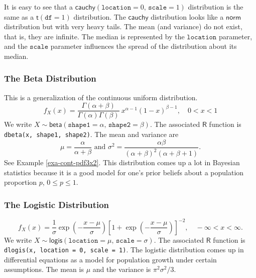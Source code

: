 \documentclass[captions=tableheading]{scrbook}
\begin{document}
It is easy to see that a \(\mathsf{cauchy}(\mathtt{location}=0,\,\mathtt{scale}=1)\) distribution is the same as a \(\mathsf{t}(\mathtt{df}=1)\) distribution. The \(\mathsf{cauchy}\) distribution looks like a \(\mathsf{norm}\) distribution but with very heavy tails. The mean (and variance) do not exist, that is, they are infinite. The median is represented by the \(\mathtt{location}\) parameter, and the \(\mathtt{scale}\) parameter influences the spread of the distribution about its median.
\subsubsection{The Beta Distribution}
\label{sec-6-5-3-2}
\label{sub-The-Beta-Distribution}


This is a generalization of the continuous uniform distribution.
\begin{equation}
f_{X}(x)=\frac{\Gamma(\alpha+\beta)}{\Gamma(\alpha)\Gamma(\beta)}\: x^{\alpha-1}(1-x)^{\beta-1},\quad0<x<1
\end{equation}
We write \(X\sim\mathsf{beta}(\mathtt{shape1}=\alpha,\,\mathtt{shape2}=\beta)\). The associated \(\mathsf{R}\) function is \texttt{dbeta(x, shape1, shape2)}. The mean and variance are
\begin{equation} 
\mu=\frac{\alpha}{\alpha+\beta}\mbox{ and }\sigma^{2}=\frac{\alpha\beta}{\left(\alpha+\beta\right)^{2}\left(\alpha+\beta+1\right)}.
\end{equation}
See Example \ref{exa-cont-pdf3x2}. This distribution comes up a lot in Bayesian statistics because it is a good model for one's prior beliefs about a population proportion \(p\), \(0\leq p\leq1\).
\subsubsection{The Logistic Distribution}
\label{sec-6-5-3-3}
\label{sub-The-Logistic-Distribution}


\begin{equation}
f_{X}(x)=\frac{1}{\sigma}\exp\left(-\frac{x-\mu}{\sigma}\right)\left[1+\exp\left(-\frac{x-\mu}{\sigma}\right)\right]^{-2},\quad-\infty<x<\infty.
\end{equation}
We write \(X\sim\mathsf{logis}(\mathtt{location}=\mu,\,\mathtt{scale}=\sigma)\). The associated \(\mathsf{R}\) function is \texttt{dlogis(x, location = 0, scale = 1)}. The logistic distribution comes up in differential equations as a model for population growth under certain assumptions. The mean is \(\mu\) and the variance is \(\pi^{2}\sigma^{2}/3\).
\end{document}

